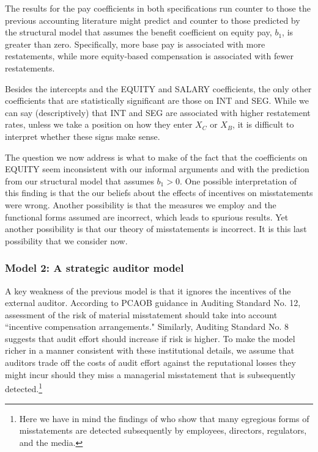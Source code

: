 \documentclass[12pt,reqno,titlepage]{amsart}
\theoremstyle{definition}
\begin{document}
\begin{doublespace}
The results for the pay coefficients in both specifications run counter to those the previous accounting literature might predict and counter to those predicted by the structural model that assumes the benefit coefficient on equity pay, $b_1$, is greater than zero.
Specifically, more base pay is associated with more restatements, while more equity-based 
compensation is associated with fewer restatements.

Besides the intercepts and the EQUITY and SALARY coefficients, the only other coefficients that are statistically significant are those on INT and SEG.
While we can say (descriptively) that INT and SEG are associated with higher restatement rates, unless we take a position on how they enter $X_C$ or $X_B$, it is difficult to interpret whether these signs make sense.

The question we now address is what to make of the fact that the coefficients on EQUITY seem inconsistent with our informal arguments and with the prediction from our structural model that assumes $b_1>0$.
One possible interpretation of this finding is that the our beliefs about the effects of  incentives on misstatements were wrong.
Another possibility is that the measures we employ and the functional forms assumed are incorrect, which leads to spurious results.
Yet another possibility is that our theory of misstatements is incorrect.
It is this last possibility that we consider now.

\subsubsection{Model 2: A strategic auditor model}
A key weakness of the previous model is that it ignores the incentives of the  external auditor.
According to PCAOB guidance in Auditing Standard No. 12, assessment of the risk of material misstatement should take into account ``incentive compensation arrangements."
Similarly, Auditing Standard No. 8 suggests that audit effort should increase if risk is higher.
To make the model richer in a manner consistent with these institutional details, we assume that auditors trade off the costs of audit effort against the reputational losses they might incur should they miss a managerial misstatement that is subsequently detected.\footnote{
Here we have in mind the findings of \citet{Dyck:2010kh} who show that many egregious forms of misstatements are detected subsequently by employees, directors, regulators, and the media.} 


\end{doublespace}
\end{document}
